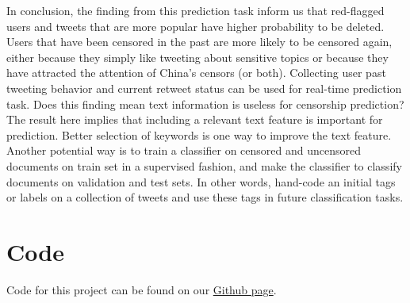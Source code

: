 \documentclass{sig-alternate-05-2015}
\begin{document}
In conclusion, the finding from this prediction task inform us that red-flagged users and tweets that are more popular have higher probability to be deleted. Users that have been censored in the past are more likely to be censored again, either because they simply like tweeting about sensitive topics or because they have attracted the attention of China's censors (or both). Collecting user past tweeting behavior and current retweet status can be used for real-time prediction task.  Does this finding mean text information is useless for censorship prediction? The result here implies that including a relevant text feature is important for prediction. Better selection of keywords is one way to improve the text feature. Another potential way is to train a classifier on censored and uncensored documents on train set in a supervised fashion, and make the classifier to classify documents on validation and test sets. In other words, hand-code an initial tags or labels on a collection of tweets and use these tags in future classification tasks.






\appendix
\section{Code}
Code for this project can be found on our \href{https://github.com/brtsay/CSE190_Assignment2}{Github page}.
\end{document}
